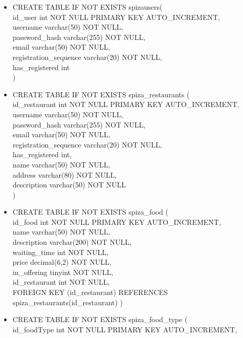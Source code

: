 \documentclass[12pt]{scrartcl}
\begin{document}
\begin{itemize}
 
    \item[] CREATE TABLE IF NOT EXISTS spiza\textunderscore users( \\
    id\_user int NOT NULL PRIMARY KEY AUTO\_INCREMENT,\\
    username varchar(50) NOT NULL,\\
    password\_hash varchar(255) NOT NULL,\\
    email varchar(50) NOT NULL,\\
    registration\_sequence varchar(20) NOT NULL,
    \\has\_registered int\\
    )
    \item[] CREATE TABLE IF NOT EXISTS spiza\_restaurants (\\
    id\_restaurant int NOT NULL PRIMARY KEY AUTO\_INCREMENT,\\
    username varchar(50) NOT NULL, \\
    password\_hash varchar(255) NOT NULL,\\
    email varchar(50) NOT NULL,\\
    registration\_sequence varchar(20) NOT NULL,\\
    has\_registered int,\\
    name varchar(50) NOT NULL,\\
    address varchar(80) NOT NULL,\\
    description varchar(50) NOT NULL\\
    )
    \item[] CREATE TABLE IF NOT EXISTS spiza\_food (\\
    id\_food int NOT NULL PRIMARY KEY AUTO\_INCREMENT,\\
    name varchar(50) NOT NULL,\\
    description varchar(200) NOT NULL,\\
    waiting\_time int NOT NULL,\\
    price decimal(6,2) NOT NULL,\\
    in\_offering tinyint NOT NULL,\\
    id\_restaurant int NOT NULL,\\
    FOREIGN KEY (id\_restaurant) REFERENCES spiza\_restaurants(id\_restaurant)
    )
    \item[] CREATE TABLE IF NOT EXISTS spiza\_food\_type (\\
    id\_foodType int NOT NULL PRIMARY KEY AUTO\_INCREMENT,\\

\end{itemize}
\end{document}
